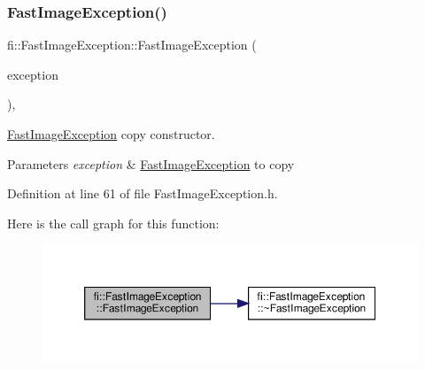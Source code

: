 \subsubsection{\texorpdfstring{Fast\+Image\+Exception()}{FastImageException()}\hspace{0.1cm}{\footnotesize\ttfamily [2/2]}}
{\footnotesize\ttfamily fi\+::\+Fast\+Image\+Exception\+::\+Fast\+Image\+Exception (\begin{DoxyParamCaption}\item[{\hyperlink{classfi_1_1FastImageException}{Fast\+Image\+Exception} \&\&}]{exception }\end{DoxyParamCaption})\hspace{0.3cm}{\ttfamily [inline]}, {\ttfamily [noexcept]}}



\hyperlink{classfi_1_1FastImageException}{Fast\+Image\+Exception} copy constructor. 


\begin{DoxyParams}{Parameters}
{\em exception} & \hyperlink{classfi_1_1FastImageException}{Fast\+Image\+Exception} to copy \\
\hline
\end{DoxyParams}


Definition at line 61 of file Fast\+Image\+Exception.\+h.

Here is the call graph for this function\+:
\nopagebreak
\begin{figure}[H]
\begin{center}
\leavevmode
\includegraphics[width=350pt]{d5/d1c/classfi_1_1FastImageException_a96ff2db20c0f2ba43ed962afa999c5fb_cgraph}
\end{center}
\end{figure}
\mbox{\label{classfi_1_1FastImageException_aee6254b5bad18046029c39f4d7688463}} 
